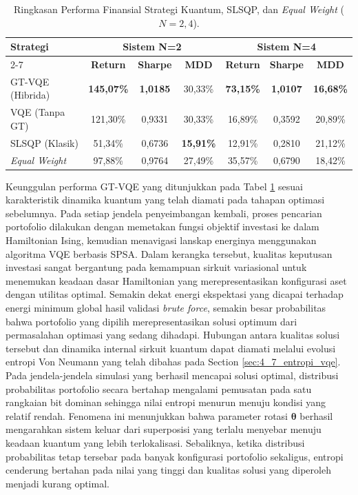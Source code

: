 \begin{table}[!htbp]
    \centering
    \caption{Ringkasan Performa Finansial Strategi Kuantum, SLSQP, dan \textit{Equal Weight} ($N=2,4$).}
    \label{tab:backtest_summary_all}
    \begin{small}
    \begin{tabular}{|l|c|c|c|c|c|c|}
    \hline
    \multirow{2}{*}{\textbf{Strategi}} & \multicolumn{3}{c|}{\textbf{Sistem N=2}} & \multicolumn{3}{c|}{\textbf{Sistem N=4}} \\ \cline{2-7} 
     & \textbf{Return} & \textbf{Sharpe} & \textbf{MDD} & \textbf{Return} & \textbf{Sharpe} & \textbf{MDD} \\ \hline
    GT-VQE (Hibrida) & \textbf{145,07\%} & \textbf{1,0185} & 30,33\% & \textbf{73,15\%} & \textbf{1,0107} & \textbf{16,68\%} \\ \hline
    VQE (Tanpa GT) & 121,30\% & 0,9331 & 30,33\% & 16,89\% & 0,3592 & 20,89\% \\ \hline
    SLSQP (Klasik) & 51,34\% & 0,6736 & \textbf{15,91\%} & 12,91\% & 0,2810 & 21,12\% \\ \hline
    \textit{Equal Weight} & 97,88\% & 0,9764 & 27,49\% & 35,57\% & 0,6790 & 18,42\% \\ \hline
    \end{tabular}
    \end{small}
\end{table}

Keunggulan performa GT-VQE yang ditunjukkan pada Tabel \ref{tab:backtest_summary_all} sesuai karakteristik dinamika kuantum yang telah diamati pada tahapan optimasi sebelumnya. Pada setiap jendela penyeimbangan kembali, proses pencarian portofolio dilakukan dengan memetakan fungsi objektif investasi ke dalam Hamiltonian Ising, kemudian menavigasi lanskap energinya menggunakan algoritma VQE berbasis SPSA. Dalam kerangka tersebut, kualitas keputusan investasi sangat bergantung pada kemampuan sirkuit variasional untuk menemukan keadaan dasar Hamiltonian yang merepresentasikan konfigurasi aset dengan utilitas optimal. Semakin dekat energi ekspektasi yang dicapai terhadap energi minimum global hasil validasi \textit{brute force}, semakin besar probabilitas bahwa portofolio yang dipilih merepresentasikan solusi optimum dari permasalahan optimasi yang sedang dihadapi. Hubungan antara kualitas solusi tersebut dan dinamika internal sirkuit kuantum dapat diamati melalui evolusi entropi Von Neumann yang telah dibahas pada Section \ref{sec:4_7_entropi_vqe}. Pada jendela-jendela simulasi yang berhasil mencapai solusi optimal, distribusi probabilitas portofolio secara bertahap mengalami pemusatan pada satu rangkaian bit dominan sehingga nilai entropi menurun menuju kondisi yang relatif rendah. Fenomena ini menunjukkan bahwa parameter rotasi $\boldsymbol{\theta}$ berhasil mengarahkan sistem keluar dari superposisi yang terlalu menyebar menuju keadaan kuantum yang lebih terlokalisasi. Sebaliknya, ketika distribusi probabilitas tetap tersebar pada banyak konfigurasi portofolio sekaligus, entropi cenderung bertahan pada nilai yang tinggi dan kualitas solusi yang diperoleh menjadi kurang optimal. 

